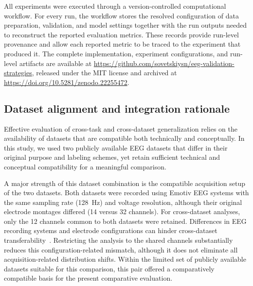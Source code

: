 \documentclass[10pt,letterpaper]{article}
\begin{document}
All experiments were executed through a version-controlled computational workflow. For every run, the workflow stores the resolved configuration of data preparation, validation, and model settings together with the run outputs needed to reconstruct the reported evaluation metrics. These records provide run-level provenance and allow each reported metric to be traced to the experiment that produced it. The complete implementation, experiment configurations, and run-level artifacts are available at \url{https://github.com/sovetskiysn/eeg-validation-strategies}, released under the MIT license and archived at \url{https://doi.org/10.5281/zenodo.22255472}.

\subsection*{Dataset alignment and integration rationale}

Effective evaluation of cross-task and cross-dataset generalization relies on the availability of datasets that are compatible both technically and conceptually. In this study, we used two publicly available EEG datasets that differ in their original purpose and labeling schemes, yet retain sufficient technical and conceptual compatibility for a meaningful comparison.

A major strength of this dataset combination is the compatible acquisition setup of the two datasets. Both datasets were recorded using Emotiv EEG systems with the same sampling rate (128~Hz) and voltage resolution, although their original electrode montages differed (14 versus 32 channels). For cross-dataset analyses, only the 12 channels common to both datasets were retained. Differences in EEG recording systems and electrode configurations can hinder cross-dataset transferability~\cite{lan2019domain}. Restricting the analysis to the shared channels substantially reduces this configuration-related mismatch, although it does not eliminate all acquisition-related distribution shifts. Within the limited set of publicly available datasets suitable for this comparison, this pair offered a comparatively compatible basis for the present comparative evaluation.
\end{document}
